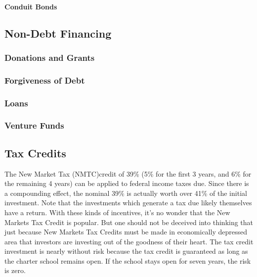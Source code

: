 \paragraph{Conduit Bonds}

\subsection{Non-Debt Financing}\indent%
\label{sec:non_debt_financing}

\subsubsection{Donations and Grants}\indent%
\label{sec:donations_grants}

\subsubsection{Forgiveness of Debt}\indent%
\label{sec:forgiveness_debt}

\subsubsection{Loans}\indent%
\label{sec:loans}

\subsubsection{Venture Funds}\indent%
\label{sec:venture_funds}

\subsection{Tax Credits}\indent%
\label{sec:tax-credit}

The New Market Tax (NMTC)credit of 39\% (5\% for the first 3 years, and 6\% for the remaining 4 years) can be applied to federal income taxes due. Since there is a compounding effect, the nominal 39\% is actually worth over 41\% of the initial investment. Note that the investments which generate a tax due likely themselves have a return. With these kinds of incentives, it's no wonder that the New Markets Tax Credit is popular. But one should not be deceived into thinking that just because New Markets Tax Credits must be made in economically depressed area that investors are investing out of the goodness of their heart. The tax credit investment is nearly without risk because the tax credit is guaranteed as long as the charter school remains open. If the school stays open for seven years, the risk is zero.

